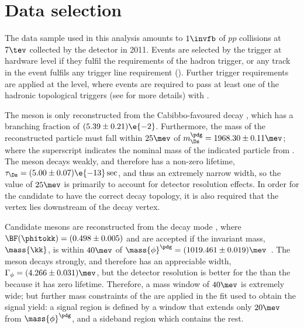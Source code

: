 \section{Data selection}
\label{sec:dsphi:sel}

The data sample used in this analysis amounts to
$1\invfb$ of $pp$ collisions at $7\tev$ collected by the \lhcb detector in 2011.
Events are selected by the trigger at hardware level if they fulfil the requirements of the \lone
hadron trigger, or any track in the event fulfils any \lone trigger line requirement (\tis).
Further trigger requirements are applied at the \hlttwo level, where events are required to pass at
least one of the hadronic topological triggers (see  for more details) with
\tos.

The \Ds meson is only reconstructed from the Cabibbo-favoured decay \dstokkpi,
which has a branching fraction of $(5.39\pm0.21)\e{-2}$.
Furthermore, the mass of the reconstructed particle must fall within $25\mev$ of
$m_{\Ds}^\pdg=1968.30\pm0.11\mev$; where the superscript \pdg indicates the nominal mass of the
indicated particle from .
The \Ds meson decays weakly, and therefore has a non-zero lifetime,
$\tau_{\Ds}=(5.00\pm0.07)\e{-13}\sec$, and thus an extremely narrow width, so the value of $25\mev$
is primarily to account for detector resolution effects.
In order for the candidate to have the correct decay topology, it is also required that the \Ds
vertex lies downstream of the \Bp decay vertex.

Candidate \phii mesons are reconstructed from the decay mode \phitokk, where
$\BF(\phitokk)=(0.498\pm0.005)$ and are accepted if the
invariant \kk mass, $\mass{\kk}$, is within $40\mev$ of
$\mass{\phi}^\pdg=(1019.461\pm0.019)\mev$~\cite{PDG2012}.
The \phii meson decays strongly, and therefore has an appreciable width,
$\Gamma_\phi=(4.266\pm0.031)\mev$, but the detector resolution is better for the \phii than the \Ds
because it has zero lifetime.
Therefore, a mass window of $40\mev$ is extremely wide; but further mass constraints of the \phii
are applied in the fit used to obtain the signal yield: a signal region is defined by a window that
extends only $20\mev$ from $\mass{\phi}^\pdg$, and a sideband region which contains the rest.

